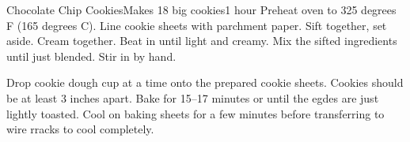 \begin{recipe}{Chocolate Chip Cookies}{Makes 18 big cookies}{1 hour}
  Preheat oven to 325 degrees F (165 degrees C).  Line cookie sheets with parchment paper.
  Sift together, set aside.
  Cream together.
  Beat in until light and creamy.  Mix the sifted ingredients until just blended.
  Stir in by hand.
  
  Drop cookie dough  cup at a time onto the prepared cookie sheets.  Cookies should be at least 3 inches apart.  Bake for 15--17 minutes or until the egdes are just lightly toasted.  Cool on baking sheets for a few minutes before transferring to wire rracks to cool completely.
\end{recipe}
